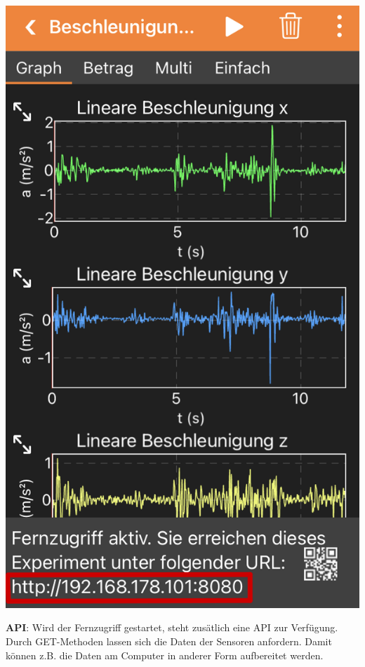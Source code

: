 \documentclass[../main.tex]{subfiles}
\begin{document}
\begin{tcolorbox}
\begin{minipage}[]{0.2\textwidth}
    \end{minipage}
    \begin{minipage}[]{0.2\textwidth}
        \includegraphics[width=\textwidth]{img/fernzugriff3}
    \end{minipage}
    
    \vspace{0.5cm}
    \textbf{API}: Wird der Fernzugriff gestartet, steht zusätlich eine API zur Verfügung. Durch GET-Methoden lassen sich die Daten der Sensoren anfordern. Damit können z.B. die Daten am Computer in anderer Form aufbereitet werden.  
    

\end{tcolorbox}
\end{document}
